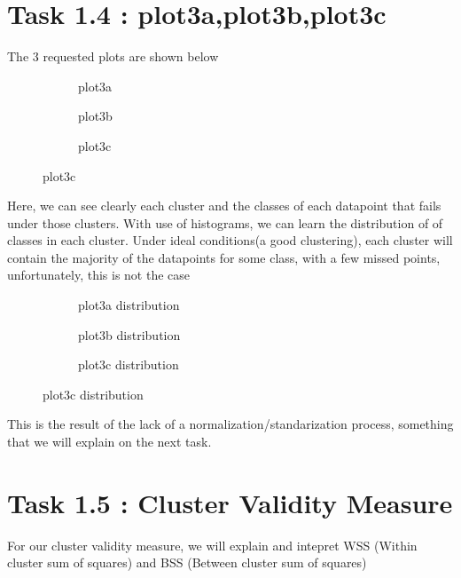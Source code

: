 \documentclass[12pt]{article}
\begin{document}
	 \section*{Task 1.4 : plot3a,plot3b,plot3c}
		The 3 requested plots are shown below
		 \begin{figure}[H]
		 	\centering
		 	\begin{subfigure}{0.4\textwidth}
		 		\caption{plot3a}
		 		\label{fig:first}
		 	\end{subfigure}
		 	\hfill
		 	\begin{subfigure}{0.4\textwidth}
		 		\caption{plot3b}
		 		\label{fig:second}
		 	\end{subfigure}
		 	\hfill
		 	\begin{subfigure}{0.4\textwidth}
		 		\caption{plot3c}
		 		\label{fig:third}
		 	\end{subfigure}
		 	
		 	\label{fig:figures}
		 \end{figure}
		Here, we can see clearly each cluster and the classes of each datapoint that fails under those clusters. With use of histograms, we can learn the distribution of of classes in each cluster. Under ideal conditions(a good clustering), each cluster will contain the majority of the datapoints for some class, with a few missed points, unfortunately, this is not the case
		\begin{figure}[H]
			\centering
			\begin{subfigure}{0.4\textwidth}
				\caption{plot3a distribution}
				\label{fig:first}
			\end{subfigure}
			\hfill
			\begin{subfigure}{0.4\textwidth}
				\caption{plot3b distribution}
				\label{fig:second}
			\end{subfigure}
			\hfill
			\begin{subfigure}{0.4\textwidth}
				\caption{plot3c distribution}
				\label{fig:third}
			\end{subfigure}
			
			\label{fig:figures}
		\end{figure}
		 This is the result of the lack of a normalization/standarization process, something that we will explain on the next task.
		 \section*{Task 1.5 : Cluster Validity Measure}
		 	For our cluster validity measure, we will explain and intepret WSS (Within cluster sum of squares) and BSS (Between cluster sum of squares)
\end{document}
